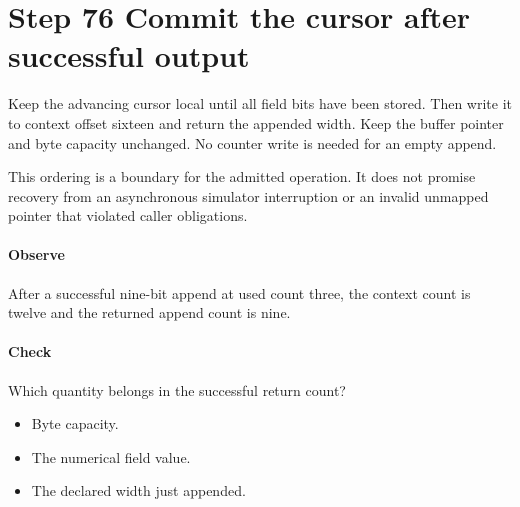 \section{Step 76 Commit the cursor after successful output}\label{h263-writer-s06}
Keep the advancing cursor local until all field bits have been stored. Then write
it to context offset sixteen and return the appended width. Keep the buffer
pointer and byte capacity unchanged. No counter write is needed for an empty
append.

This ordering is a boundary for the admitted operation. It does not promise
recovery from an asynchronous simulator interruption or an invalid unmapped
pointer that violated caller obligations.

\paragraph{Observe} After a successful nine-bit append at used count three,
the context count is twelve and the returned append count is nine.
\paragraph{Check} Which quantity belongs in the successful return count?
\begin{itemize}
  \item[A.] Byte capacity.
  \item[B.] The numerical field value.
  \item[C.] The declared width just appended.
\end{itemize}

